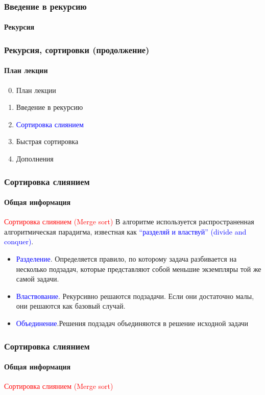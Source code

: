 \documentclass[aspectratio=169]{beamer}
\begin{document}
\begin{frame}
\frametitle{Введение в рекурсию}
\framesubtitle{Рекурсия}
\justifying

\end{frame}

\begin{frame}
\frametitle{Рекурсия, сортировки (продолжение)}
\framesubtitle{План лекции}

\begin{enumerate}
  \setcounter{enumi}{-1}
  \item{План лекции}
  \item{Введение в рекурсию}
  \item{\textcolor{blue}{Сортировка слиянием}}
  \item{Быстрая сортировка}
  \item{Дополнения}
\end{enumerate}
\end{frame}



\begin{frame}
\frametitle{Сортировка слиянием}
\framesubtitle{Общая информация}
\justifying
\textcolor{red}{Сортировка слиянием (Merge sort)}\newline\newline
В алгоритме используется распространенная алгоритмическая парадигма, известная как \textcolor{blue}{“разделяй и властвуй” (divide and conquer)}. \newline
\begin{itemize}
\item{\textcolor{blue}{Разделение}. Определяется правило, по которому задача разбивается на несколько подзадач, которые представляют собой меньшие экземпляры той же самой задачи.}
\item{\textcolor{blue}{Властвование}. Рекурсивно решаются подзадачи. Если они достаточно малы, они решаются как базовый случай.}
\item{\textcolor{blue}{Объединение}.Решения подзадач объединяются в решение исходной задачи}
\end{itemize}

\end{frame}

\begin{frame}
\frametitle{Сортировка слиянием}
\framesubtitle{Общая информация}
\justifying
\textcolor{red}{Сортировка слиянием (Merge sort)}
\begin{figure}
    \captionsetup[subfigure]{labelformat=empty}
    \centering
\end{figure}

\end{frame}
\end{document}
